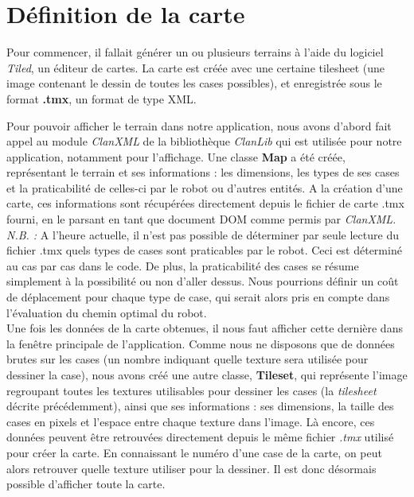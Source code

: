 \documentclass[a4paper 12pts]{article}
\begin{document}
\newpage

\section{Définition de la carte}
\vspace{1cm}
Pour commencer, il fallait générer un ou plusieurs terrains à l'aide du logiciel \emph{Tiled}, un éditeur de cartes. La carte est créée avec une certaine tilesheet (une image contenant le dessin de toutes les cases possibles), et enregistrée sous le format \textbf{.tmx}, un format de type XML.

Pour pouvoir afficher le terrain dans notre application, nous avons d'abord fait appel au module \emph{ClanXML} de la bibliothèque \emph{ClanLib} qui est utilisée pour notre application, notamment pour l'affichage. Une classe \textbf{Map} a été créée, représentant le terrain et ses informations : les dimensions, les types de ses cases et la praticabilité de celles-ci par le robot ou d'autres entités. A la création d'une carte, ces informations sont récupérées directement depuis le fichier de carte .tmx fourni, en le parsant en tant que document DOM comme permis par \emph{ClanXML}. \\
\emph{N.B. :} A l'heure actuelle, il n'est pas possible de déterminer par seule lecture du fichier .tmx quels types de cases sont praticables par le robot. Ceci est déterminé au cas par cas dans le code. De plus, la praticabilité des cases se résume simplement à la possibilité ou non d'aller dessus. Nous pourrions définir un coût de déplacement pour chaque type de case, qui serait alors pris en compte dans l'évaluation du chemin optimal du robot.\\

Une fois les données de la carte obtenues, il nous faut afficher cette dernière dans la fenêtre principale de l'application. Comme nous ne disposons que de données brutes sur les cases (un nombre indiquant quelle texture sera utilisée pour dessiner la case), nous avons créé une autre classe, \textbf{Tileset}, qui représente l'image regroupant toutes les textures utilisables pour dessiner les cases (la \emph{tilesheet} décrite précédemment), ainsi que ses informations : ses dimensions, la taille des cases en pixels et l'espace entre chaque texture dans l'image. Là encore, ces données peuvent être retrouvées directement depuis le même fichier \emph{.tmx} utilisé pour créer la carte.
En connaissant le numéro d'une case de la carte, on peut alors retrouver quelle texture utiliser pour la dessiner. Il est donc désormais possible d'afficher toute la carte.
\end{document}
